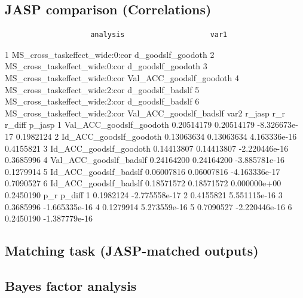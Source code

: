 \documentclass[
  english,
  jou]{apa6}
\newenvironment{Shaded}{\begin{snugshade}}{\end{snugshade}}
\newcommand{\ControlFlowTok}[1]{\textcolor[rgb]{0.13,0.29,0.53}{\textbf{#1}}}
\newcommand{\DecValTok}[1]{\textcolor[rgb]{0.00,0.00,0.81}{#1}}
\newcommand{\FunctionTok}[1]{\textcolor[rgb]{0.13,0.29,0.53}{\textbf{#1}}}
\newcommand{\NormalTok}[1]{#1}
\newcommand{\SpecialCharTok}[1]{\textcolor[rgb]{0.81,0.36,0.00}{\textbf{#1}}}
\newcommand{\StringTok}[1]{\textcolor[rgb]{0.31,0.60,0.02}{#1}}
\begin{document}
\subsection{JASP comparison (Correlations)}\label{jasp-comparison-correlations}

\begin{verbatim}
                    analysis                    var1
\end{verbatim}

1 MS\_cross\_taskeffect\_wide:0:cor d\_goodslf\_goodoth
2 MS\_cross\_taskeffect\_wide:0:cor d\_goodslf\_goodoth
3 MS\_cross\_taskeffect\_wide:0:cor Val\_ACC\_goodslf\_goodoth
4 MS\_cross\_taskeffect\_wide:2:cor d\_goodslf\_badslf
5 MS\_cross\_taskeffect\_wide:2:cor d\_goodslf\_badslf
6 MS\_cross\_taskeffect\_wide:2:cor Val\_ACC\_goodslf\_badslf
var2 r\_jasp r\_r r\_diff p\_jasp
1 Val\_ACC\_goodslf\_goodoth 0.20514179 0.20514179 -8.326673e-17 0.1982124
2 Id\_ACC\_goodslf\_goodoth 0.13063634 0.13063634 4.163336e-16 0.4155821
3 Id\_ACC\_goodslf\_goodoth 0.14413807 0.14413807 -2.220446e-16 0.3685996
4 Val\_ACC\_goodslf\_badslf 0.24164200 0.24164200 -3.885781e-16 0.1279914
5 Id\_ACC\_goodslf\_badslf 0.06007816 0.06007816 -4.163336e-17 0.7090527
6 Id\_ACC\_goodslf\_badslf 0.18571572 0.18571572 0.000000e+00 0.2450190
p\_r p\_diff
1 0.1982124 -2.775558e-17
2 0.4155821 5.551115e-16
3 0.3685996 -1.665335e-16
4 0.1279914 5.273559e-16
5 0.7090527 -2.220446e-16
6 0.2450190 -1.387779e-16

\begin{Shaded}
\end{Shaded}

\subsection{Matching task (JASP-matched outputs)}\label{matching-task-jasp-matched-outputs}

\subsection{Bayes factor analysis}\label{bayes-factor-analysis}
\end{document}
